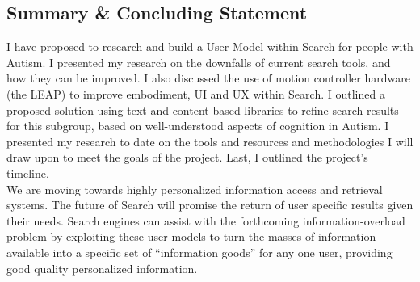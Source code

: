 \documentclass[10pt]{article}
\begin{document}
\subsection{Summary \& Concluding Statement}\label{future}
I have proposed to research and build a User Model within Search for people with Autism. I presented my research on the downfalls of current search tools, and how they can be improved. I also discussed the use of motion controller hardware (the LEAP) to improve embodiment, UI and UX within Search. I outlined a proposed solution using text and content based libraries to refine search results for this subgroup, based on well-understood aspects of cognition in Autism. I presented my research to date on the tools and resources and methodologies I will draw upon to meet the goals of the project. Last, I outlined the project's timeline.\\
We are moving towards highly personalized information access and retrieval systems. The future of Search will promise the return of user specific results given their needs. Search engines can assist with the forthcoming information-overload problem by exploiting these user models to turn the masses of information available into a specific set of “information goods” for any one user, providing good quality personalized information.
\end{document}
